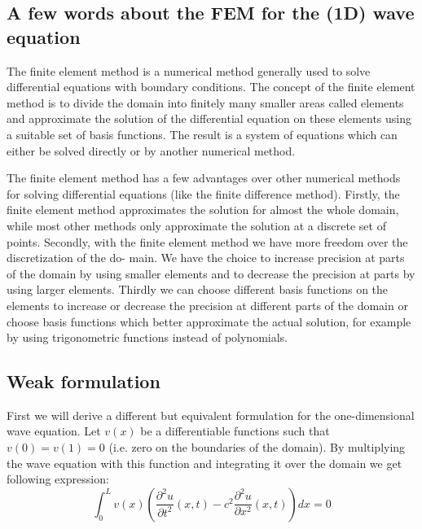 \subsection{A few words about the FEM for the (1D) wave equation}

The finite element method is a numerical method generally used to solve differential equations with boundary
conditions. The concept of the finite element method is to divide the domain into finitely many smaller areas
called elements and approximate the solution of the differential equation on these elements using a suitable
set of basis functions. The result is a system of equations which can either be solved directly or by another
numerical method.


The finite element method has a few advantages over other numerical methods for solving differential equations (like the finite difference method). Firstly, the finite element method 
approximates the solution for
almost the whole domain, while most other methods only approximate the solution at a discrete set of
points. Secondly, with the finite element method we have more freedom over the discretization of the do-
main. We have the choice to increase precision at parts of the domain by using smaller elements and to
decrease the precision at parts by using larger elements. Thirdly we can choose different basis functions on
the elements to increase or decrease the precision at different parts of the domain or choose basis functions
which better approximate the actual solution, for example by using trigonometric functions instead of polynomials.

\subsection{Weak formulation}



First we will derive a different but equivalent formulation for the one-dimensional wave equation. 
Let $v(x)$ be a differentiable functions such that $v(0)=v(1)=0$ (i.e. zero on the boundaries
of the domain). By multiplying the wave equation with this function and integrating 
it over the domain we get following expression:
\[
\int_0^L  v(x) \left( \frac{\partial^2 u}{\partial t^2}(x,t) - c^2  
\frac{\partial^2 u}{\partial x^2}(x,t)\right) dx =0
\]

